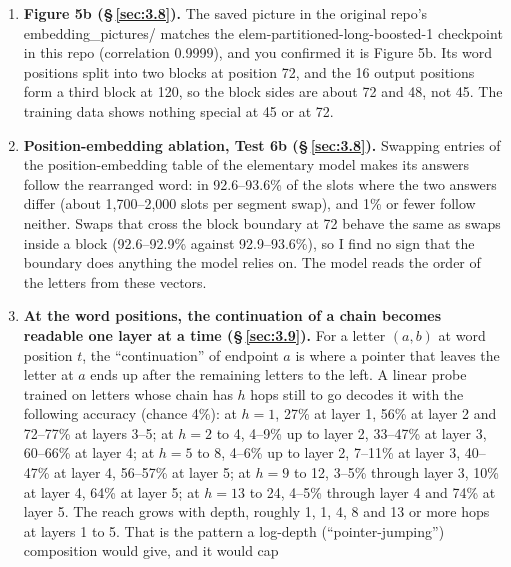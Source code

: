 \documentclass[paper=a4,fontsize=11pt,DIV=11,parskip=half,headings=small,numbers=noendperiod]{scrartcl}
\DeclareRobustCommand{\lead}[1]{\textsf{\bfseries\color{accent}#1}}
\DeclareRobustCommand{\code}[1]{{\fontseries{m}\ttfamily #1}}
\begin{document}
\begin{enumerate}
  follow 24 hops, so the cliff is not a limit of what the architecture can represent; whether
  \code{torn-\allowbreak{}bigger-\allowbreak{}13} learned a rule limited by its depth is open, and items 24 and
  25 make that the most coherent reading I have. The end of the training chains is not the explanation either:
  the decline on fresh chains starts at 13 to 15 hops, where the training file holds hundreds to thousands of
  chains (item 24).
\item \lead{Figure 5b (\S\,\ref{sec:3.8}).} The saved picture in the original repo’s
  \code{embedding\_\allowbreak{}pictures/} matches the
  \code{elem-\allowbreak{}partitioned-\allowbreak{}long-\allowbreak{}boosted-\allowbreak{}1} checkpoint in this
  repo (correlation 0.9999), and you confirmed it is Figure 5b. Its word positions split into two blocks at
  position 72, and the 16 output positions form a third block at 120, so the block sides are about 72 and 48,
  not 45. The training data shows nothing special at 45 or at 72.
\item \lead{Position-embedding ablation, Test 6b (\S\,\ref{sec:3.8}).} Swapping entries of the
  position-embedding table of the elementary model makes its answers follow the rearranged word: in 92.6–93.6\%
  of the slots where the two answers differ (about 1,700–2,000 slots per segment swap), and 1\% or fewer follow
  neither. Swaps that cross the block boundary at 72 behave the same as swaps inside a block (92.6–92.9\%
  against 92.9–93.6\%), so I find no sign that the boundary does anything the model relies on. The model reads
  the order of the letters from these vectors.
\item \lead{At the word positions, the continuation of a chain becomes readable one layer at a time
  (\S\,\ref{sec:3.9}).} For a letter $(a,b)$ at word position $t$, the “continuation” of endpoint $a$ is where a
  pointer that leaves the letter at $a$ ends up after the remaining letters to the left. A linear probe trained
  on letters whose chain has $h$ hops still to go decodes it with the following accuracy (chance 4\%): at $h=1$,
  27\% at layer 1, 56\% at layer 2 and 72–77\% at layers 3–5; at $h=2$ to 4, 4–9\% up to layer 2, 33–47\% at
  layer 3, 60–66\% at layer 4; at $h=5$ to 8, 4–6\% up to layer 2, 7–11\% at layer 3, 40–47\% at layer 4,
  56–57\% at layer 5; at $h=9$ to 12, 3–5\% through layer 3, 10\% at layer 4, 64\% at layer 5; at $h=13$ to 24,
  4–5\% through layer 4 and 74\% at layer 5. The reach grows with depth, roughly 1, 1, 4, 8 and 13 or more hops
  at layers 1 to 5. That is the pattern a log-depth (“pointer-jumping”) composition would give, and it would cap

\end{enumerate}
\end{document}
